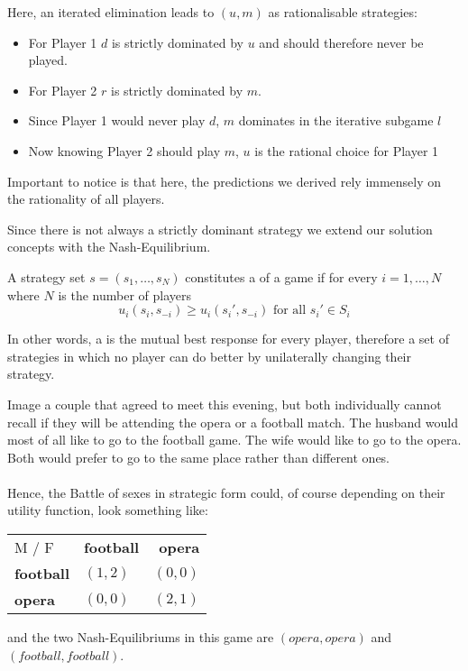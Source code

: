 Here, an iterated elimination leads to $(u, m)$ as rationalisable strategies:
\begin{itemize}
	\item For Player 1 $d$ is strictly dominated by $u$ and should therefore never be played.
	\item For Player 2 $r$ is strictly dominated by $m$.
	\item Since Player 1 would never play $d$, $m$ dominates in the iterative subgame $l$
	\item Now knowing Player 2 should play $m$, $u$ is the rational choice for Player 1
\end{itemize} 	

Important to notice is that here, the predictions we derived rely immensely on the rationality of all players.

Since there is not always a strictly dominant strategy we extend our solution concepts with the Nash-Equilibrium.

\begin{definition} \label{nashequilibrium} 
A strategy set $s = (s_{1}, \dotsc, s_{N})$ constitutes a  of a game if for every $i = 1, \dotsc, N$ where $N$ is the number of players
	\[ u_{i}(s_{i}, s_{-i}) \geq u_{i}(s_{i}', s_{-i}) \text{ for all } s_{i}' \in S_{i} \]
\end{definition}

In other words, a  is the mutual best response for every player, therefore a set of strategies in which no player can do better by unilaterally changing their strategy. \\

\begin{example} \label{battleofthesexes} 
		Image a couple that agreed to meet this evening, but both individually cannot recall if they will be attending the opera or a football match. The husband would most of all like to go to the football game. The wife would like to go to the opera. Both would prefer to go to the same place rather than different ones. \\ \\
		Hence, the Battle of sexes in strategic form could, of course depending on their utility function, look something like:
		\begin{center}
			\begin{tabular}{|l|l|r|}
				\hline\hline
  					M / F & \textbf{football} & \textbf{opera} \\
         				\cline{1-3}
   					\textbf{football} & $(1, 2)$ & $(0, 0)$ 	\arrayrulewidth2pt \\
            			\cline{1-3}
   					\textbf{opera} & $(0, 0)$ & $(2, 1)$ \\ \hline\hline
			\end{tabular}	
		\end{center}
		
		and the two Nash-Equilibriums in this game are $(opera, opera)$ and $(football, football)$.
\end{example}

